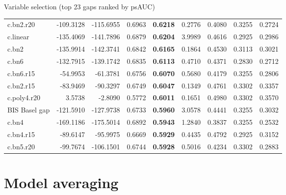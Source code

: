 \documentclass[
  ignorenonframetext,
]{beamer}
\begin{document}
\begin{frame}{Variable selection (top 23 gaps ranked by psAUC)}
{\begin{tabular}[t]{lrrr>{}rrrrr}
\addlinespace
c.bn2.r20 & -109.3128 & -115.6955 & 0.6963 & \textbf{0.6218} & 0.2776 & 0.4080 & 0.3255 & 0.2724\\
c.linear & -135.4069 & -141.7896 & 0.6879 & \textbf{0.6204} & 3.9989 & 0.4616 & 0.2925 & 0.2986\\
c.bn2 & -135.9914 & -142.3741 & 0.6842 & \textbf{0.6165} & 0.1864 & 0.4530 & 0.3113 & 0.3021\\
c.bn6 & -132.7915 & -139.1742 & 0.6835 & \textbf{0.6113} & 0.4710 & 0.4371 & 0.2830 & 0.2712\\
c.bn6.r15 & -54.9953 & -61.3781 & 0.6756 & \textbf{0.6070} & 0.5680 & 0.4179 & 0.3255 & 0.2806\\
\addlinespace
c.bn2.r15 & -83.9469 & -90.3297 & 0.6749 & \textbf{0.6047} & 0.1349 & 0.4761 & 0.3302 & 0.3357\\
c.poly4.r20 & 3.5738 & -2.8090 & 0.5772 & \textbf{0.6011} & 0.1651 & 0.4980 & 0.3302 & 0.3570\\
BIS Basel gap & -121.5910 & -127.9738 & 0.6733 & \textbf{0.5960} & 3.0578 & 0.4441 & 0.3255 & 0.3032\\
c.bn4 & -169.1186 & -175.5014 & 0.6892 & \textbf{0.5943} & 1.2840 & 0.3837 & 0.3255 & 0.2532\\
c.bn4.r15 & -89.6147 & -95.9975 & 0.6669 & \textbf{0.5929} & 0.4435 & 0.4792 & 0.2925 & 0.3152\\
\addlinespace
c.bn5.r20 & -99.7674 & -106.1501 & 0.6744 & \textbf{0.5928} & 0.5016 & 0.4234 & 0.3302 & 0.2883\\
\bottomrule
\end{tabular}}
\end{frame}

\hypertarget{model-averaging}{%
\section{Model averaging}\label{model-averaging}}
\end{document}
